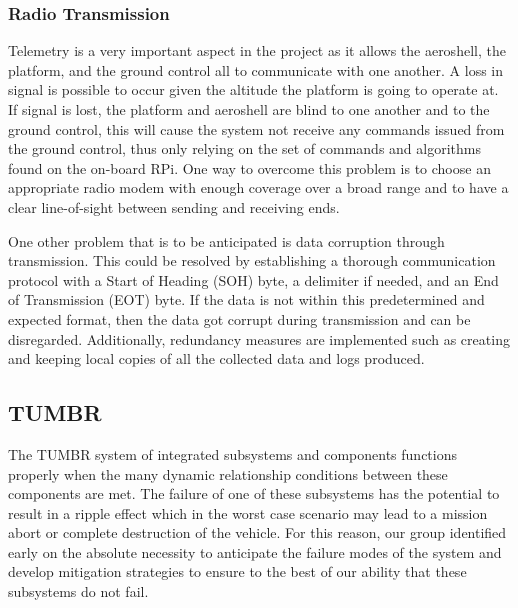 \subsubsection*{Radio Transmission}

\indent\indent Telemetry is a very important aspect in the project as it allows the aeroshell, the platform, and the ground control all to communicate with one another. A loss in signal is possible to occur given the altitude the platform is going to operate at. If signal is lost, the platform and aeroshell are blind to one another and to the ground control, this will cause the system not receive any commands issued from the ground control, thus only relying on the set of commands and algorithms found on the on-board RPi. One way to overcome this problem is to choose an appropriate radio modem with enough coverage over a broad range and to have a clear line-of-sight between sending and receiving ends.

One other problem that is to be anticipated is data corruption through transmission. This could be resolved by establishing a thorough communication protocol with a Start of Heading (SOH) byte, a delimiter if needed, and an End of Transmission (EOT) byte. If the data is not within this predetermined and expected format, then the data got corrupt during transmission and can be disregarded. Additionally, redundancy measures are implemented such as creating and keeping local copies of all the collected data and logs produced.


\subsection{TUMBR}

\indent\indent The TUMBR system of integrated subsystems and components functions properly when the many dynamic relationship conditions between these components are met. The failure of one of these subsystems has the potential to result in a ripple effect which in the worst case scenario may lead to a mission abort or complete destruction of the vehicle. For this reason, our group identified early on the absolute necessity to anticipate the failure modes of the system and develop mitigation strategies to ensure to the best of our ability that these subsystems do not fail.

